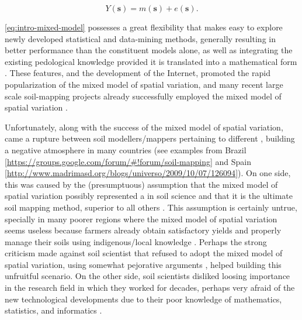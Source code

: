 \begin{equation}\label{eq:intro-mixed-model}
 Y(\boldsymbol{s}) = m(\boldsymbol{s}) + e(\boldsymbol{s}).
\end{equation}

\autoref{eq:intro-mixed-model} possesses a great flexibility that makes easy to explore newly developed 
statistical and data-mining methods, generally resulting in better performance than the constituent 
models alone, as well as integrating the existing pedological knowledge provided it is translated into a
mathematical form \cite{OdehEtAl1994,OdehEtAl1995,Heuvelink1996,McBratneyEtAl2000,HenglEtAl2004,Lopez-GranadosEtAl2005,WebsterEtAl2007,Grunwald2009,Lark2012}. These features, and the development 
of the Internet, promoted the rapid popularization of the mixed model of spatial variation, and many 
recent large scale soil-mapping projects already successfully employed the mixed model of spatial 
variation \cite{PoggioEtAl2014,NussbaumEtAl2014,HenglEtAl2015}.

Unfortunately, along with the success of the mixed model of spatial variation, came a rupture 
between soil modellers/mappers pertaining to different , building a negative atmosphere in many 
countries (see examples from Brazil [\url{https://groups.google.com/forum/#!forum/soil-mapping}] and
Spain [\url{http://www.madrimasd.org/blogs/universo/2009/10/07/126094}]). On one side, this was 
caused by the (presumptuous) assumption that the mixed model of spatial variation possibly 
represented a  in soil science \cite{McBratneyEtAl2003} and that it is the 
ultimate soil mapping method, superior to all others \cite{MinasnyEtAl2016}. This assumption is 
certainly untrue, specially in many poorer regions where the mixed model of spatial variation seems 
useless because farmers already obtain satisfactory yields and properly manage their soils using 
indigenous/local knowledge 
\cite{Barrera-BassolsEtAl2003,Barrera-BassolsEtAl2006,HillyerEtAl2006,CorreiaEtAl2007,ValeJuniorEtAl2007}.
 Perhaps the strong criticism made against soil scientist that 
refused to adopt the mixed model of spatial variation, using somewhat pejorative arguments 
\cite{HeuvelinkEtAl2001,Mendonca-SantosEtAl2003}, helped building this unfruitful scenario. On 
the other side, soil scientists disliked loosing importance in the research field in which they worked for 
decades, perhaps very afraid of the new technological developments due to their poor knowledge of 
mathematics, statistics, and informatics \cite{Webster2001,SamuelRosa2012}.

